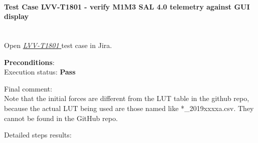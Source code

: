 \documentclass[SE,lsstdraft,STR,toc]{lsstdoc}
\begin{document}
\paragraph{Test Case LVV-T1801 - verify M1M3 SAL 4.0 telemetry against GUI display }\mbox{}\\

Open  \href{https://jira.lsstcorp.org/secure/Tests.jspa#/testCase/LVV-T1801}{\textit{ LVV-T1801 } }
test case in Jira.



\textbf{ Preconditions}:\\


Execution status: {\bf Pass }

Final comment:\\Note that the initial forces are different from the LUT table in the
github repo, because the actual LUT being used are those named like
*\_2019xxxxa.csv. They cannot be found in the GitHub repo.


Detailed steps results:
\end{document}
